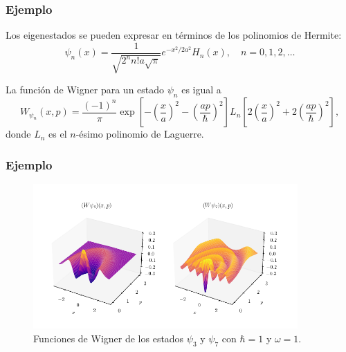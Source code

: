 \documentclass[10pt,spanish]{beamer}
\begin{document}
  \begin{frame}
    \frametitle{Ejemplo}

    \begin{example}
      Los eigenestados se pueden expresar en términos de los
      polinomios de Hermite:
      \begin{equation}
        \psi_n(x) = \frac{1}{\sqrt{2^{n} n! a \sqrt{\pi}}}
        e^{-x^2 / 2a^2} H_n(x),
        \quad n = 0,1,2,\ldots
      \end{equation}

      \vspace{5pt}

      \pause

      La función de Wigner para un estado $\psi_n$ es igual
      a 
      \begin{equation}
        W_{\psi_n}(x,p)
        = \frac{(-1)^{n}}{\pi} 
        \exp\left[
          -\left( \frac{x}{a} \right)^2
          - \left( \frac{ap}{\hbar} \right)^2
        \right]
        L_n\left[
          2\left( \frac{x}{a} \right)^2 
          + 2\left( \frac{ap}{\hbar} \right)^2
        \right],
      \end{equation}
      donde $L_n$ es el $n$-ésimo polinomio de Laguerre.
    \end{example}
  \end{frame}

  \begin{frame}
    \frametitle{Ejemplo}

    \begin{figure}[h]
      \centering
      \includegraphics[width=0.9\textwidth]{
      imgs/harmonic_osc_wigner.png}
      \caption{
      Funciones de Wigner de los estados $\psi_3$ y $\psi_7$ 
      con $\hbar = 1$ y $\omega = 1$.}
      \label{fig:harmonic_osc_wigner}
    \end{figure}
  \end{frame}
\end{document}
